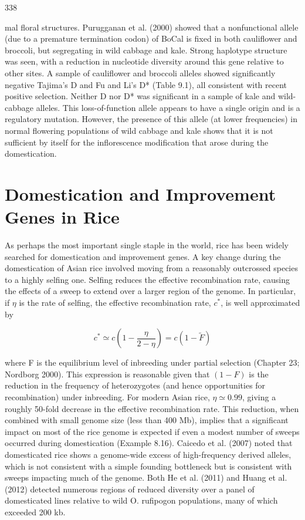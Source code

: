 \documentclass{article}
\begin{document}
338

mal floral structures. Purugganan et al. (2000) showed that a nonfunctional allele (due to a premature termination codon) of BoCal is fixed in both cauliflower and broccoli, but segregating in wild cabbage and kale. Strong haplotype structure was seen, with a reduction in nucleotide diversity around this gene relative to other sites. A sample of cauliflower and broccoli alleles showed significantly negative Tajima's D and Fu and Li's D* (Table 9.1), all consistent with recent positive selection. Neither D nor D* was significant in a sample of kale and wild-cabbage alleles. This loss-of-function allele appears to have a single origin and is a regulatory mutation. However, the presence of this allele (at lower frequencies) in normal flowering populations of wild cabbage and kale shows that it is not sufficient by itself for the inflorescence modification that arose during the domestication.

\section{Domestication and Improvement Genes in Rice}
As perhaps the most important single staple in the world, rice has been widely searched for domestication and improvement genes. A key change during the domestication of Asian rice involved moving from a reasonably outcrossed species to a highly selfing one. Selfing reduces the effective recombination rate, causing the effects of a sweep to extend over a larger region of the genome. In particular, if  $ \eta $ is the rate of selfing, the effective recombination rate,  $ c^{*} $, is well approximated by

\begin{equation}
c^{*}\simeq c\left(1-\frac{\eta}{2-\eta}\right)=c(1-\widetilde{F})
\tag{9.44}
\label{eq:9_44}
\end{equation}

where F is the equilibrium level of inbreeding under partial selection (Chapter 23; Nordborg 2000). This expression is reasonable given that  $ (1 - F) $ is the reduction in the frequency of heterozygotes (and hence opportunities for recombination) under inbreeding. For modern Asian rice,  $ \eta \simeq 0.99 $, giving a roughly 50-fold decrease in the effective recombination rate. This reduction, when combined with small genome size (less than 400 Mb), implies that a significant impact on most of the rice genome is expected if even a modest number of sweeps occurred during domestication (Example 8.16). Caicedo et al. (2007) noted that domesticated rice shows a genome-wide excess of high-frequency derived alleles, which is not consistent with a simple founding bottleneck but is consistent with sweeps impacting much of the genome. Both He et al. (2011) and Huang et al. (2012) detected numerous regions of reduced diversity over a panel of domesticated lines relative to wild O. rufipogon populations, many of which exceeded 200 kb.
\end{document}
